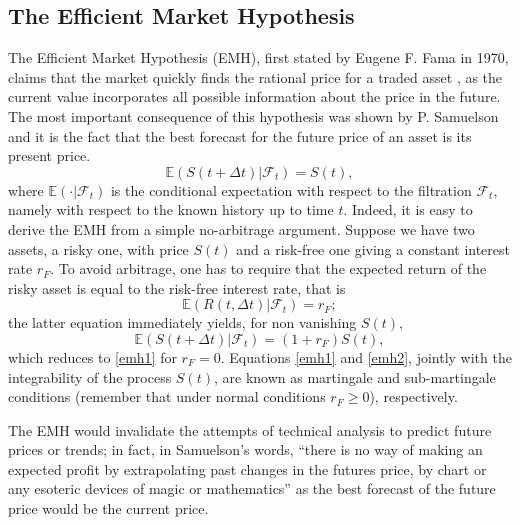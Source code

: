 \documentclass[a4paper]{jpconf}
\begin{document}
\subsection{The Efficient Market Hypothesis}
\label{efficient}
The Efficient Market Hypothesis (EMH), first stated by Eugene F. Fama in 1970, claims that the market quickly finds the rational price for a traded asset \cite{Mantegna}, as the current value incorporates all possible information about the price in the future. The most important consequence of this hypothesis was shown by P. Samuelson \cite{Samuelson 2} and it is the fact that the best forecast for the future price of an asset is its present price.
\begin{equation}
\label{emh1}
\mathbb{E}(S(t+\Delta t)|\mathcal{F}_t ) = S(t),
\end{equation} 
where $\mathbb{E}(\cdot|\mathcal{F}_t)$ is the conditional expectation with respect to the filtration $\mathcal{F}_t$, namely with respect to the known history up to time $t$. Indeed, it is easy to derive the EMH from a simple no-arbitrage argument. Suppose we have two assets, a risky one, with price $S(t)$ and a risk-free one giving a constant interest rate $r_F$. To avoid arbitrage, one has to require that the expected return of the risky asset is equal to the risk-free interest rate, that is
\begin{equation}
\mathbb{E} (R(t, \Delta t)|\mathcal{F}_t) = r_F;
\end{equation}
the latter equation immediately yields, for non vanishing $S(t)$,
\begin{equation}
\label{emh2}
\mathbb{E}(S(t+\Delta t)|\mathcal{F}_t ) = (1+r_F) S(t),
\end{equation}
which reduces to \eqref{emh1} for $r_F = 0$. Equations \eqref{emh1} and
\eqref{emh2}, jointly with the integrability of the process $S(t)$, are known as martingale and sub-martingale conditions (remember that under normal conditions $r_F \geq 0$), respectively.

The EMH would invalidate the attempts of technical analysis to predict future prices or trends; in fact, in Samuelson's words, ``there is no way of making an expected profit by extrapolating past changes in the futures price, by chart or any esoteric devices of magic or mathematics'' \cite{Samuelson 2} as the best forecast of the future price would be the current price.
\end{document}
